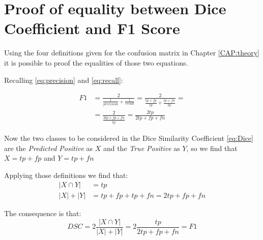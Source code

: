 \documentclass{standalone}
\begin{document}
\chapter {Proof of equality between Dice Coefficient and F1 Score}\label{APPENDIX:Dice_F1}

Using the four definitions given for the confusion matrix in Chapter \ref{CAP:theory} it is possible to proof the equalities of those two equations.

Recalling \ref{eq:precision} and \ref{eq:recall}:

    \begin{equation}
    \begin{align*}
        F1 & = \frac{2}{ \frac{1}{precision} + \frac{1}{recall}} =  
        \frac{2}{ \frac{tp + fp}{tp} + \frac{tp + fn}{tp}} = \\
         & = \frac{2}{\frac{2tp + fp + fn}{tp}} =
        \frac{2tp}{2tp + fp + fn}
    \end{align*}
    \end{equation}

Now the two classes to be considered in the Dice Similarity Coefficient \ref{eq:Dice} are the \textit{Predicted Positive} as $X$ and the \textit{True Positive} as $Y$, so we find that $X = tp + fp$ and $Y = tp + fn$

Applying those definitions we find that:
    \begin{equation}
    \begin{align*}
         |X \cap Y|  & = tp  \\
        |X| + |Y|  & = tp + fp + tp + fn = 2tp + fp + fn
    \end{align*}
    \end{equation}

The consequence is that:
\begin{equation}
DSC = 2\frac{|X \cap Y |}{|X| + |Y|} = 2\frac{tp}{2tp + fp + fn} = F1
\end{equation}
\end{document}
